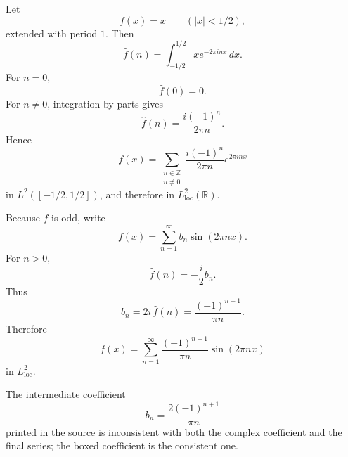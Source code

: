 \begin{solution}
Let
\[
f(x)=x
\qquad
(|x|<1/2),
\]
extended with period \(1\). Then
\[
\widehat f(n)
=
\int_{-1/2}^{1/2}
x e^{-2\pi inx}\,dx.
\]
For \(n=0\),
\[
\widehat f(0)=0.
\]
For \(n\neq0\), integration by parts gives
\[
\boxed{
\widehat f(n)
=
\frac{i(-1)^n}{2\pi n}.
}
\]
Hence
\[
\boxed{
f(x)
=
\sum_{\substack{n\in\mathbb Z\\n\neq0}}
\frac{i(-1)^n}{2\pi n}
e^{2\pi inx}
}
\]
in \(L^2([-1/2,1/2])\), and therefore in
\(L^2_{\mathrm{loc}}(\mathbb R)\).

Because \(f\) is odd, write
\[
f(x)
=
\sum_{n=1}^{\infty}
b_n\sin(2\pi nx).
\]
For \(n>0\),
\[
\widehat f(n)
=
-\frac{i}{2}b_n.
\]
Thus
\[
b_n
=
2i\,\widehat f(n)
=
\frac{(-1)^{n+1}}{\pi n}.
\]
Therefore
\[
\boxed{
f(x)
=
\sum_{n=1}^{\infty}
\frac{(-1)^{n+1}}{\pi n}
\sin(2\pi nx)
}
\]
in \(L^2_{\mathrm{loc}}\).

The intermediate coefficient
\[
b_n=\frac{2(-1)^{n+1}}{\pi n}
\]
printed in the source is inconsistent with both the complex coefficient and the final series;
the boxed coefficient is the consistent one.
\end{solution}


